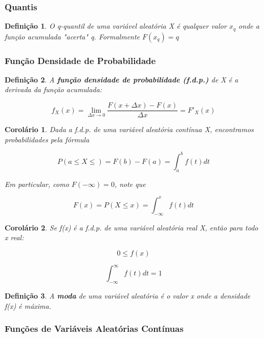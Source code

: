 \documentclass[12pt]{article}
\newtheorem{corollary}{Corolário}[theorem]
\newtheorem{definition}{Definição}
\begin{document}
\subsubsection*{Quantis}

\begin{definition}
    O q-quantil de uma variável aleatória X é qualquer valor $x_q$ onde a função acumulada "acerta" q. Formalmente $F(x_q) = q$
\end{definition}

\subsubsection*{Função Densidade de Probabilidade}

\begin{definition}
    A \textbf{função densidade de probabilidade (f.d.p.)} de X é a derivada da função acumulada:
    
    $$f_X(x) = \lim_{\Delta x \rightarrow{} 0} \dfrac{F(x + \Delta x) - F(x)}{\Delta x} = F'_X (x)$$
\end{definition}

\begin{corollary}
    Dada a f.d.p. de uma variável aleatória contínua X, encontramos probabilidades pela fórmula
    
    $$P(a \leq X \leq) = F(b) - F(a) = \int_a^b f(t) d t$$
    
    Em particular, como $F(- \infty) = 0$, note que
    
    $$F(x) = P(X \leq x) = \int_{-\infty}^x f(t) d t$$
\end{corollary}

\begin{corollary}
    Se f(x) é a f.d.p. de uma variável aleatória real X, então para todo x real:
    
    $$0 \leq f(x)$$
    
    $$\int_{- \infty}^{\infty} f(t) d t = 1$$
\end{corollary}

\begin{definition}
    A \textbf{moda} de uma variável aleatória é o valor x onde a densidade f(x) é máxima.
\end{definition}

\subsubsection*{Funções de Variáveis Aleatórias Contínuas}
\end{document}
